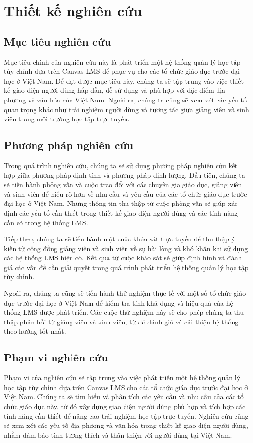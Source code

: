\documentclass[../Thesis.tex]{subfiles}
\begin{document}
\section{Thiết kế nghiên cứu}
    \subsection{Mục tiêu nghiên cứu}
    Mục tiêu chính của nghiên cứu này là phát triển một hệ thống quản lý học tập tùy chỉnh dựa trên Canvas LMS để phục vụ cho các tổ chức giáo dục trước đại học ở Việt Nam. Để đạt được mục tiêu này, chúng ta sẽ tập trung vào việc thiết kế giao diện người dùng hấp dẫn, dễ sử dụng và phù hợp với đặc điểm địa phương và văn hóa của Việt Nam. Ngoài ra, chúng ta cũng sẽ xem xét các yếu tố quan trọng khác như trải nghiệm người dùng và tương tác giữa giảng viên và sinh viên trong môi trường học tập trực tuyến.
    \subsection{Phương pháp nghiên cứu}
    Trong quá trình nghiên cứu, chúng ta sẽ sử dụng phương pháp nghiên cứu kết hợp giữa phương pháp định tính và phương pháp định lượng. Đầu tiên, chúng ta sẽ tiến hành phỏng vấn và cuộc trao đổi với các chuyên gia giáo dục, giảng viên và sinh viên để hiểu rõ hơn về nhu cầu và yêu cầu của các tổ chức giáo dục trước đại học ở Việt Nam. Những thông tin thu thập từ cuộc phỏng vấn sẽ giúp xác định các yếu tố cần thiết trong thiết kế giao diện người dùng và các tính năng cần có trong hệ thống LMS.

    Tiếp theo, chúng ta sẽ tiến hành một cuộc khảo sát trực tuyến để thu thập ý kiến từ cộng đồng giảng viên và sinh viên về sự hài lòng và khó khăn khi sử dụng các hệ thống LMS hiện có. Kết quả từ cuộc khảo sát sẽ giúp định hình và đánh giá các vấn đề cần giải quyết trong quá trình phát triển hệ thống quản lý học tập tùy chỉnh.

    Ngoài ra, chúng ta cũng sẽ tiến hành thử nghiệm thực tế với một số tổ chức giáo dục trước đại học ở Việt Nam để kiểm tra tính khả dụng và hiệu quả của hệ thống LMS được phát triển. Các cuộc thử nghiệm này sẽ cho phép chúng ta thu thập phản hồi từ giảng viên và sinh viên, từ đó đánh giá và cải thiện hệ thống theo hướng tốt nhất.
    \subsection{Phạm vi nghiên cứu}
    Phạm vi của nghiên cứu sẽ tập trung vào việc phát triển một hệ thống quản lý học tập tùy chỉnh dựa trên Canvas LMS cho các tổ chức giáo dục trước đại học ở Việt Nam. Chúng ta sẽ tìm hiểu và phân tích các yêu cầu và nhu cầu của các tổ chức giáo dục này, từ đó xây dựng giao diện người dùng phù hợp và tích hợp các tính năng cần thiết để nâng cao trải nghiệm học tập trực tuyến. Nghiên cứu cũng sẽ xem xét các yếu tố địa phương và văn hóa trong thiết kế giao diện người dùng, nhằm đảm bảo tính tương thích và thân thiện với người dùng tại Việt Nam.
\end{document}
